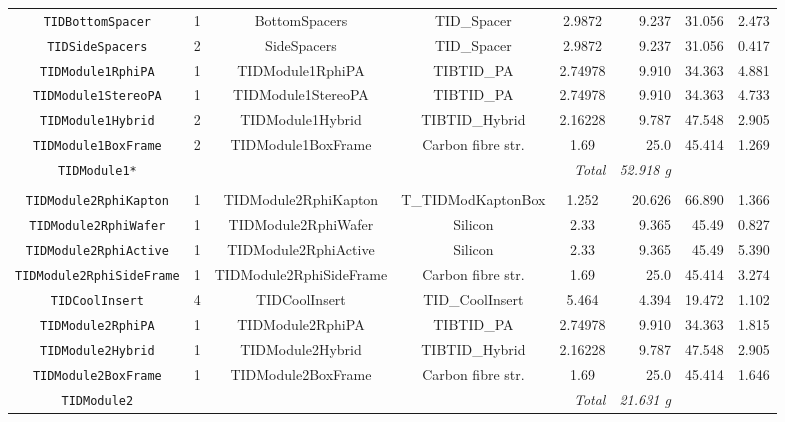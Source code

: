 \documentclass{cmspaper}
\begin{document}
\begin{table}
\begin{center}
\begin{tabular}{cccccrrr}
	 {\tt TIDBottomSpacer}              & 1     & BottomSpacers                 & TID\_Spacer           & 2.9872         &  9.237 & 31.056   & 2.473\\
	 {\tt TIDSideSpacers}               & 2     & SideSpacers                   & TID\_Spacer           & 2.9872         &  9.237 & 31.056   & 0.417\\
	 {\tt TIDModule1RphiPA}             & 1     & TIDModule1RphiPA              & TIBTID\_PA            & 2.74978        & 9.910  & 34.363   & 4.881\\
	 {\tt TIDModule1StereoPA}           & 1     & TIDModule1StereoPA            & TIBTID\_PA            & 2.74978        & 9.910  & 34.363   & 4.733\\
	 {\tt TIDModule1Hybrid}             & 2     & TIDModule1Hybrid              & TIBTID\_Hybrid        & 2.16228        & 9.787  & 47.548   & 2.905\\
	 {\tt TIDModule1BoxFrame}           & 2     & TIDModule1BoxFrame            & Carbon fibre str.     & 1.69           &  25.0  & 45.414   & 1.269\\
	 {\tt TIDModule1*}             & \multicolumn{4}{r}{\em Total } & {\em 52.918 g } & \\
	 \hline	 \\
	 {\tt TIDModule2RphiKapton}     & 1     & TIDModule2RphiKapton          & T\_TIDModKaptonBox    & 1.252          &  20.626 & 66.890  & 1.366  \\
	 {\tt TIDModule2RphiWafer}      & 1     & TIDModule2RphiWafer           & Silicon               & 2.33           &  9.365  & 45.49   & 0.827  \\
	 {\tt TIDModule2RphiActive}     & 1     & TIDModule2RphiActive          & Silicon               & 2.33           &  9.365  & 45.49   & 5.390  \\
	 {\tt TIDModule2RphiSideFrame}  & 1     & TIDModule2RphiSideFrame       & Carbon fibre str.     & 1.69           &  25.0   & 45.414  & 3.274  \\
	 {\tt TIDCoolInsert}            & 4     & TIDCoolInsert                 & TID\_CoolInsert       & 5.464          &  4.394 & 19.472   & 1.102  \\
	 {\tt TIDModule2RphiPA}         & 1     & TIDModule2RphiPA              & TIBTID\_PA            & 2.74978        &  9.910 & 34.363   & 1.815  \\
	 {\tt TIDModule2Hybrid}         & 1     & TIDModule2Hybrid              & TIBTID\_Hybrid        & 2.16228        &  9.787 & 47.548   & 2.905  \\
	 {\tt TIDModule2BoxFrame}       & 1     & TIDModule2BoxFrame            & Carbon fibre str.     & 1.69           &  25.0   & 45.414  & 1.646 \\
	 {\tt TIDModule2}          & \multicolumn{4}{r}{\em Total } & {\em 21.631 g} & \\
	 \hline
    \end{tabular}
  \end{center}
\end{table}
%


 
\pagebreak
\end{document}
